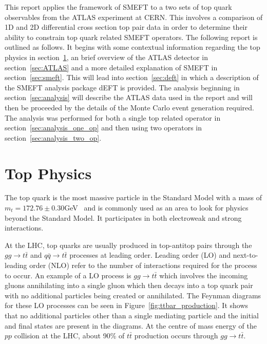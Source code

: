 \documentclass[a4paper,11pt]{article}
\begin{document}
This report applies the framework of SMEFT to a two sets of top quark observables from the ATLAS experiment at CERN.
This involves a comparison of 1D and 2D differential cross section top pair data in order to determine their ability to constrain top quark related SMEFT operators.
The following report is outlined as follows.
It begins with some contextual information regarding the top physics in section~\ref{sec:topquarks}, an brief overview of the ATLAS detector in section~\ref{sec:ATLAS} and a more detailed explanation of SMEFT in section~\ref{sec:smeft}.
This will lead into section~\ref{sec:deft} in which a description of the SMEFT analysis package dEFT is provided.
The analysis beginning in section~\ref{sec:analysis} will describe the ATLAS data used in the report and will then be proceeded by the details of the Monte Carlo event generation required.
The analysis was performed for both a single top related operator in section~\ref{sec:analysis_one_op} and then using two operators in section~\ref{sec:analysis_two_op}.

\section{Top Physics}\label{sec:topquarks}

The top quark is the most massive particle in the Standard Model with a mass of $m_{t} =172.76\pm0.30$GeV~\cite{ParticleDataGroup:2020ssz} and is commonly used as an area to look for physics beyond the Standard Model.
It participates in both electroweak and strong interactions.

At the LHC, top quarks are usually produced in top-antitop pairs through the $gg\rightarrow t\bar{t}$ and $q\bar{q}\rightarrow t\bar{t}$ processes at leading order.
Leading order (LO) and next-to-leading order (NLO) refer to the number of interactions required for the process to occur.
An example of a LO process is $gg\rightarrow t\bar{t}$ which involves the incoming gluons annihilating into a single gluon which then decays into a top quark pair with no additional particles being created or annihilated.
The Feynman diagrams for these LO processes can be seen in Figure~\ref{fig:ttbar_production}.
It shows that no additional particles other than a single mediating particle and the initial and final states are present in the diagrams.
At the centre of mass energy of the $pp$ collision at the LHC, about 90\% of $t\bar{t}$ production occurs through $gg\rightarrow t\bar{t}$.
\end{document}
